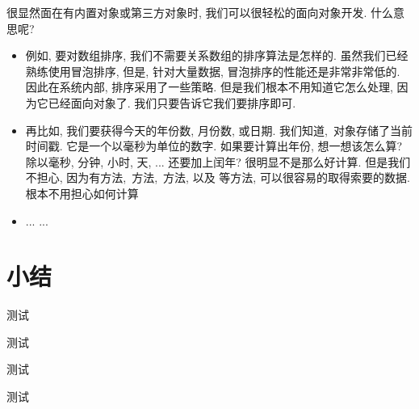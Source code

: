 很显然面在有内置对象或第三方对象时, 我们可以很轻松的面向对象开发. 什么意思呢?

\begin{itemize}
\item 例如, 要对数组排序, 我们不需要关系数组的排序算法是怎样的. 虽然我们已经熟练使用冒泡排序, 
      但是, 针对大量数据, 冒泡排序的性能还是非常非常低的. 因此在系统内部, 排序采用了一些策略.
      但是我们根本不用知道它怎么处理, 因为它已经面向对象了. 我们只要告诉它我们要排序即可.
\item 再比如, 我们要获得今天的年份数, 月份数, 或日期. 我们知道, 
      \,对象存储了当前时间戳. 它是一个以毫秒为单位的数字. 如果要计算出年份,
      想一想该怎么算? 除以毫秒, 分钟, 小时, 天, ... 还要加上闰年? 很明显不是那么好计算. 
      但是我们不担心, 因为有方法, \,方法, \,方法,
      以及\,\,等方法, 可以很容易的取得索要的数据. 根本不用担心如何计算
\item ... ...
\end{itemize}






\section{小结}








\begin{exercise}
\item 测试
\item 测试
\item 测试
\item 测试
\end{exercise}








